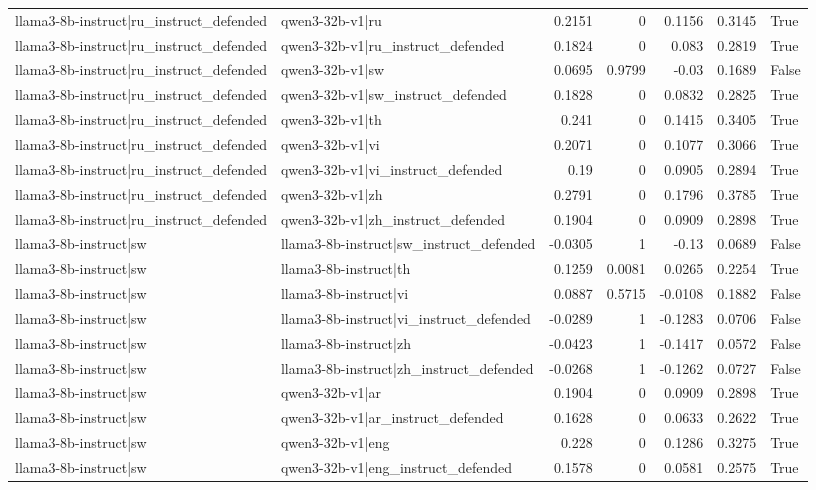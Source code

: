 \begin{table}
\begin{tabular}{l l r r r r l}
llama3-8b-instruct|ru_instruct_defended & qwen3-32b-v1|ru & 0.2151 & 0 & 0.1156 & 0.3145 & True \\
llama3-8b-instruct|ru_instruct_defended & qwen3-32b-v1|ru_instruct_defended & 0.1824 & 0 & 0.083 & 0.2819 & True \\
llama3-8b-instruct|ru_instruct_defended & qwen3-32b-v1|sw & 0.0695 & 0.9799 & -0.03 & 0.1689 & False \\
llama3-8b-instruct|ru_instruct_defended & qwen3-32b-v1|sw_instruct_defended & 0.1828 & 0 & 0.0832 & 0.2825 & True \\
llama3-8b-instruct|ru_instruct_defended & qwen3-32b-v1|th & 0.241 & 0 & 0.1415 & 0.3405 & True \\
llama3-8b-instruct|ru_instruct_defended & qwen3-32b-v1|vi & 0.2071 & 0 & 0.1077 & 0.3066 & True \\
llama3-8b-instruct|ru_instruct_defended & qwen3-32b-v1|vi_instruct_defended & 0.19 & 0 & 0.0905 & 0.2894 & True \\
llama3-8b-instruct|ru_instruct_defended & qwen3-32b-v1|zh & 0.2791 & 0 & 0.1796 & 0.3785 & True \\
llama3-8b-instruct|ru_instruct_defended & qwen3-32b-v1|zh_instruct_defended & 0.1904 & 0 & 0.0909 & 0.2898 & True \\
llama3-8b-instruct|sw & llama3-8b-instruct|sw_instruct_defended & -0.0305 & 1 & -0.13 & 0.0689 & False \\
llama3-8b-instruct|sw & llama3-8b-instruct|th & 0.1259 & 0.0081 & 0.0265 & 0.2254 & True \\
llama3-8b-instruct|sw & llama3-8b-instruct|vi & 0.0887 & 0.5715 & -0.0108 & 0.1882 & False \\
llama3-8b-instruct|sw & llama3-8b-instruct|vi_instruct_defended & -0.0289 & 1 & -0.1283 & 0.0706 & False \\
llama3-8b-instruct|sw & llama3-8b-instruct|zh & -0.0423 & 1 & -0.1417 & 0.0572 & False \\
llama3-8b-instruct|sw & llama3-8b-instruct|zh_instruct_defended & -0.0268 & 1 & -0.1262 & 0.0727 & False \\
llama3-8b-instruct|sw & qwen3-32b-v1|ar & 0.1904 & 0 & 0.0909 & 0.2898 & True \\
llama3-8b-instruct|sw & qwen3-32b-v1|ar_instruct_defended & 0.1628 & 0 & 0.0633 & 0.2622 & True \\
llama3-8b-instruct|sw & qwen3-32b-v1|eng & 0.228 & 0 & 0.1286 & 0.3275 & True \\
llama3-8b-instruct|sw & qwen3-32b-v1|eng_instruct_defended & 0.1578 & 0 & 0.0581 & 0.2575 & True \\

\end{tabular}
\end{table}
